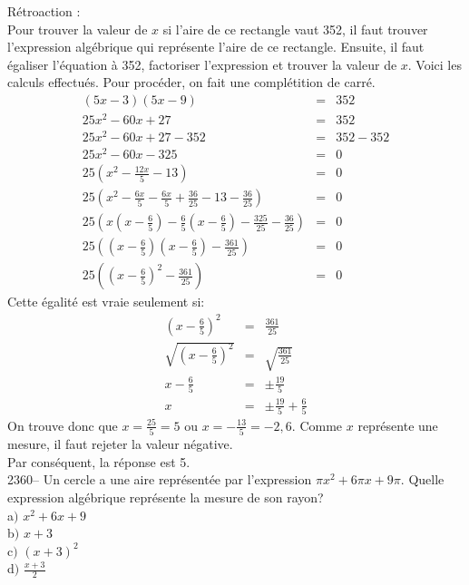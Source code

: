 \documentclass[letterpaper, 12pt]{article}
\begin{document}
R\'etroaction :\\
Pour trouver la valeur de $x$ si l'aire de ce rectangle vaut 352, il faut trouver l'expression alg\'ebrique qui repr\'esente l'aire de ce rectangle. Ensuite, il faut \'egaliser l'\'equation \`a 352, factoriser l'expression et trouver la valeur de $x$. Voici les calculs effectu\'es. Pour proc\'eder, on fait une compl\'etition de carr\'e.
\begin{eqnarray*}
 (5x-3)(5x-9)&=&352\\
 25x^{2}-60x+27&=&352\\
 25x^{2}-60x+27-352&=&352-352\\
 25x^{2}-60x-325&=&0\\[2mm]
 25\left(x^{2}-\frac{12x}{5}-13\right)&=&0\\[2mm]
 25\left(x^{2}-\frac{6x}{5}-\frac{6x}{5}+\frac{36}{25}-13-\frac{36}{25}\right)&=&0\\[2mm]
 25\left(x\left(x-\frac{6}{5}\right)-\frac{6}{5}\left(x-\frac{6}{5}\right)-\frac{325}{25}-\frac{36}{25}\right)&=&0\\[2mm]
 25\left(\left(x-\frac{6}{5}\right)\left(x-\frac{6}{5}\right)-\frac{361}{25}\right)&=&0\\[2mm]
 25\left(\left(x-\frac{6}{5}\right)^{2}-\frac{361}{25}\right)&=&0
\end{eqnarray*}
Cette \'egalit\'e est vraie seulement si:
\begin{eqnarray*}
 \left(x-\frac{6}{5}\right)^{2}&=&\frac{361}{25}\\[2mm]
 \sqrt{\left(x-\frac{6}{5}\right)^{2}}&=&\sqrt{\frac{361}{25}}\\[2mm]
x-\frac{6}{5}&=&\pm\frac{19}{5}\\[2mm]
x&=&\pm\frac{19}{5}+\frac{6}{5}
\end{eqnarray*}
On trouve donc que $x=\frac{25}{5}=5$ ou $x=-\frac{13}{5}=-2,6$. Comme $x$ repr\'esente une mesure, il faut rejeter la valeur n\'egative.\\
Par cons\'equent, la r\'eponse est 5.\\

2360-- Un cercle a une aire repr\'esent\'ee par l'expression $\pi x^{2}+6\pi x+9\pi$. Quelle expression alg\'ebrique repr\'esente la mesure de son rayon?\\

a$)$ $x^{2}+6x+9$\\
b$)$ $x+3$\\
c$)$ $(x+3)^{2}$\\
d$)$ $\frac{x+3}{2}$\\
\end{document}

